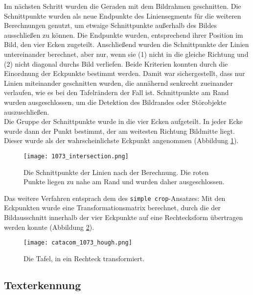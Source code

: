 Im nächsten Schritt wurden die Geraden mit dem Bildrahmen geschnitten. Die Schnittpunkte wurden als neue Endpunkte des Liniensegments für die weiteren Berechnungen genutzt, um etwaige Schnittpunkte außerhalb des Bildes ausschließen zu können. Die Endpunkte wurden, entsprechend ihrer Position im Bild, den vier Ecken zugeteilt. Anschließend wurden die Schnittpunkte der Linien untereinander berechnet, aber nur, wenn sie (1) nicht in die gleiche Richtung und (2) nicht diagonal durchs Bild verliefen. Beide Kriterien konnten durch die Einordnung der Eckpunkte bestimmt werden. Damit war sichergestellt, dass nur Linien miteinander geschnitten wurden, die annähernd senkrecht zueinander verlaufen, wie es bei den Tafelrändern der Fall ist. Schnittpunkte am Rand wurden ausgeschlossen, um die Detektion des Bildrandes oder Störobjekte auszuschließen.\\
Die Gruppe der Schnittpunkte wurde in die vier Ecken aufgeteilt. In jeder Ecke wurde dann der Punkt bestimmt, der am weitesten Richtung Bildmitte liegt. Dieser wurde als der wahrscheinlichste Eckpunkt angenommen (Abbildung \ref{fig:intersection}).
\begin{figure}[h!]
\centering
\texttt{[image: 1073\_intersection.png]}
\caption{Die Schnittpunkte der Linien nach der Berechnung. Die roten Punkte liegen zu nahe am Rand und wurden daher ausgeschlossen.}
\label{fig:intersection}
\end{figure}
Das weitere Verfahren entsprach dem des \verb|simple crop|-Ansatzes: Mit den Eckpunkten wurde eine Transformationsmatrix berechnet, durch die der Bildausschnitt innerhalb der vier Eckpunkte auf eine Rechtecksform übertragen werden konnte (Abbildung \ref{fig:houghcrop}).
\begin{figure}[h!]
\centering
\texttt{[image: catacom\_1073\_hough.png]}
\caption{Die Tafel, in ein Rechteck transformiert.}
\label{fig:houghcrop}
\end{figure}

\subsection{Texterkennung}


